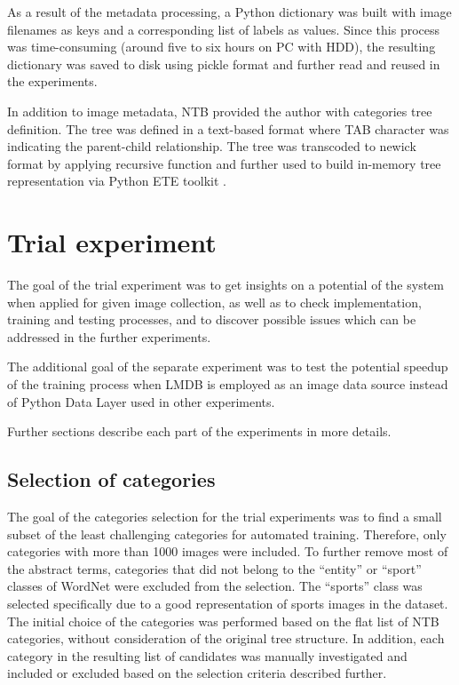 As a result of the metadata processing, a Python dictionary was built with image filenames as keys and a corresponding list of labels as values. Since this process was time-consuming (around five to six hours on PC with HDD), the resulting dictionary was saved to disk using pickle \cite{pickle} format and further read and reused in the experiments.

In addition to image metadata, NTB provided the author with categories tree definition. The tree was defined in a text-based format where TAB character was indicating the parent-child relationship. The tree was transcoded to newick \cite{newick} format by applying recursive function and further used to build in-memory tree representation via Python ETE toolkit \cite{ete3}.


\section{Trial experiment}
    The goal of the trial experiment was to get insights on a potential of the system when applied for given image collection, as well as to check implementation, training and testing processes, and to discover possible issues which can be addressed in the further experiments.
    
    The additional goal of the separate experiment was to test the potential speedup of the training process when LMDB is employed as an image data source instead of Python Data Layer used in other experiments.
    
    Further sections describe each part of the experiments in more details.
    
    \subsection{Selection of categories}
    \label{sec:trial-cat-selection}
    The goal of the categories selection for the trial experiments was to find a small subset of the least challenging categories for automated training. Therefore, only categories with more than 1000 images were included. To further remove most of the abstract terms, categories that did not belong to the ``entity'' or ``sport'' classes of WordNet \cite{wordnet} were excluded from the selection. The ``sports'' class was selected specifically due to a good representation of sports images in the dataset. The initial choice of the categories was performed based on the flat list of NTB categories, without consideration of the original tree structure. In addition, each category in the resulting list of candidates was manually investigated and included or excluded based on the selection criteria described further.
    
